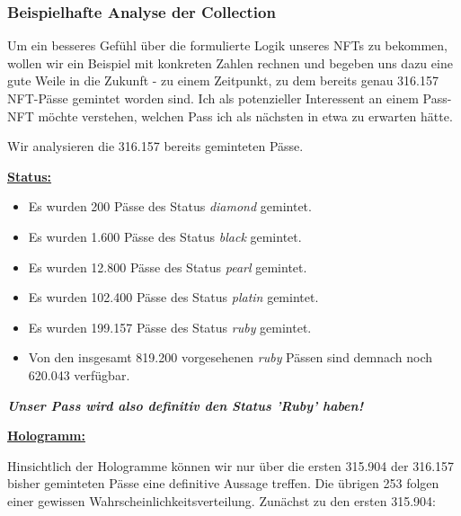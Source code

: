 
\subsubsection{Beispielhafte Analyse der Collection}

\vspace{0.2cm}

Um ein besseres Gefühl über die formulierte Logik unseres NFTs zu bekommen, wollen wir ein Beispiel mit konkreten Zahlen rechnen und begeben uns dazu eine gute Weile in die Zukunft - zu einem Zeitpunkt, zu dem bereits genau 316.157 NFT-Pässe gemintet worden sind. Ich als potenzieller Interessent an einem Pass-NFT möchte verstehen, welchen Pass ich als nächsten in etwa zu erwarten hätte.

\vspace{0.2cm} 

Wir analysieren die 316.157 bereits geminteten Pässe.

\vspace{0.5cm} 

\underline{\textbf{Status:}}

\begin{itemize}
  \item Es wurden 200 Pässe des Status \textit{diamond} gemintet.
  \item Es wurden 1.600 Pässe des Status \textit{black} gemintet.
  \item Es wurden 12.800 Pässe des Status \textit{pearl} gemintet.
  \item Es wurden 102.400 Pässe des Status \textit{platin} gemintet.
  \item Es wurden 199.157 Pässe des Status \textit{ruby} gemintet.
  \item Von den insgesamt 819.200 vorgesehenen \textit{ruby} Pässen sind demnach noch 620.043 verfügbar.
\end{itemize}

\vspace{0.2cm}

\textit{\textbf{Unser Pass wird also definitiv den Status 'Ruby' haben!}}

\vspace{1.0cm}


\underline{\textbf{Hologramm:}}

\vspace{0.2cm}

Hinsichtlich der Hologramme können wir nur über die ersten 315.904 der 316.157 bisher geminteten Pässe eine definitive Aussage treffen. Die übrigen 253 folgen einer gewissen Wahrscheinlichkeitsverteilung. Zunächst zu den ersten 315.904:

